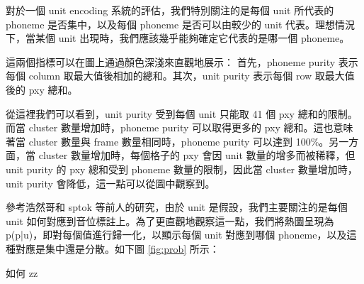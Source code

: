 
{



    對於一個 unit encoding 系統的評估，我們特別關注的是每個 unit 所代表的 phoneme 是否集中，以及每個 phoneme 是否可以由較少的 unit 代表。理想情況下，當某個 unit 出現時，我們應該幾乎能夠確定它代表的是哪一個 phoneme。

這兩個指標可以在圖上通過顏色深淺來直觀地展示：
首先，phoneme purity 表示每個 column 取最大值後相加的總和。其次，unit purity 表示每個 row 取最大值後的 pxy 總和。 

從這裡我們可以看到，unit purity 受到每個 unit 只能取 41 個 pxy 總和的限制。而當 cluster 數量增加時，phoneme purity 可以取得更多的 pxy 總和。這也意味著當 cluster 數量與 frame 數量相同時，phoneme purity 可以達到 100\%。另一方面，當 cluster 數量增加時，每個格子的 pxy 會因 unit 數量的增多而被稀釋，但 unit purity 的 pxy 總和受到 phoneme 數量的限制，因此當 cluster 數量增加時，unit purity 會降低，這一點可以從圖中觀察到。

參考浩然哥和 sptok 等前人的研究，由於 unit 是假設，我們主要關注的是每個 unit 如何對應到音位標註上。為了更直觀地觀察這一點，我們將熱圖呈現為 p(p|u)，即對每個值進行歸一化，以顯示每個 unit 對應到哪個 phoneme，以及這種對應是集中還是分散。如下圖 \ref{fig:prob} 所示：

}

        如何
zz